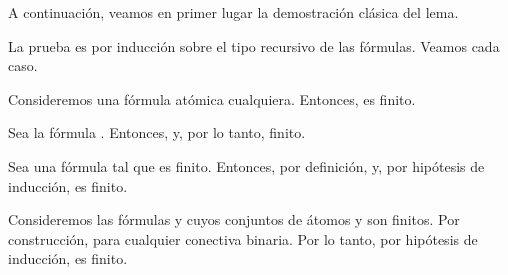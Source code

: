 \begin{isabellebody}
\begin{isamarkuptext}
  A continuación, veamos en primer lugar la demostración clásica del 
  lema. 

  \begin{demostracion}
  La prueba es por inducción sobre el tipo recursivo de las fórmulas. 
  Veamos cada caso.
  
  Consideremos una fórmula atómica  cualquiera. Entonces, 
   es finito.

  Sea la fórmula \isa{{\isasymbottom}}. Entonces,  y, por lo tanto, 
  finito.
  
  Sea  una fórmula tal que  es finito. Entonces, por 
  definición,  y, por hipótesis de 
  inducción, es finito.

  Consideremos las fórmulas  y  cuyos conjuntos de átomos 
   y  son finitos. Por construcción, 
   para cualquier \isa{{\isacharasterisk}} 
  conectiva binaria. Por lo tanto, por hipótesis de inducción, 
   es finito. 
  \end{demostracion} 


\end{isamarkuptext}
\end{isabellebody}
